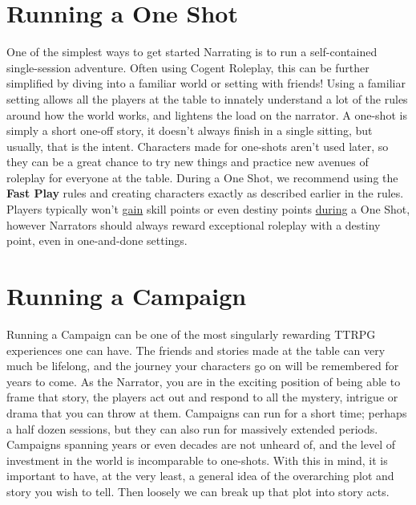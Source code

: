 \section{Running a One Shot}

One of the simplest ways to get started Narrating is to run a self-contained single-session adventure. Often using Cogent Roleplay, this can be further simplified by diving into a familiar world or setting with friends! Using a familiar setting allows all the players at the table to innately understand a lot of the rules around how the world works, and lightens the load on the narrator. A one-shot is simply a short one-off story, it doesn’t always finish in a single sitting, but usually, that is the intent. Characters made for one-shots aren’t used later, so they can be a great chance to try new things and practice new avenues of roleplay for everyone at the table. During a One Shot, we recommend using the \textbf{Fast Play} rules and creating characters exactly as described earlier in the rules. Players typically won’t \underline{gain} skill points or even destiny points \underline{during} a One Shot, however Narrators should always reward exceptional roleplay with a destiny point, even in one-and-done settings.

\section{Running a Campaign}

Running a Campaign can be one of the most singularly rewarding TTRPG experiences one can have. The friends and stories made at the table can very much be lifelong, and the journey your characters go on will be remembered for years to come. As the Narrator, you are in the exciting position of being able to frame that story, the players act out and respond to all the mystery, intrigue or drama that you can throw at them. Campaigns can run for a short time; perhaps a half dozen sessions, but they can also run for massively extended periods. Campaigns spanning years or even decades are not unheard of, and the level of investment in the world is incomparable to one-shots. With this in mind, it is important to have, at the very least, a general idea of the overarching plot and story you wish to tell. Then loosely we can break up that plot into story acts.

